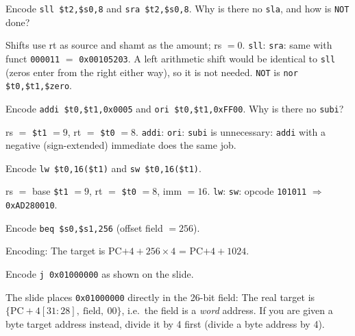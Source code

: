 \begin{exercise}[Shifts]
Encode \texttt{sll \$t2,\$s0,8} and \texttt{sra \$t2,\$s0,8}. Why is there no
\texttt{sla}, and how is \texttt{NOT} done?
\end{exercise}
\begin{solution}
Shifts use rt as source and shamt as the amount; rs $=0$.
\texttt{sll}: 
\texttt{sra}: same with funct \texttt{000011} $=$ \texttt{0x00105203}.
A left arithmetic shift would be identical to \texttt{sll} (zeros enter from
the right either way), so it is not needed. \texttt{NOT} is
\texttt{nor \$t0,\$t1,\$zero}.
\end{solution}

\begin{exercise}
Encode \texttt{addi \$t0,\$t1,0x0005} and
\texttt{ori \$t0,\$t1,0xFF00}. Why is there no \texttt{subi}?
\end{exercise}
\begin{solution}
rs $=$ \texttt{\$t1} $=9$, rt $=$ \texttt{\$t0} $=8$.
\texttt{addi}: 
\texttt{ori}: 
\texttt{subi} is unnecessary: \texttt{addi} with a negative (sign-extended)
immediate does the same job.
\end{solution}

\begin{exercise}
Encode \texttt{lw \$t0,16(\$t1)} and \texttt{sw \$t0,16(\$t1)}.
\end{exercise}
\begin{solution}
rs $=$ base \texttt{\$t1} $=9$, rt $=$ \texttt{\$t0} $=8$, imm $=16$.
\texttt{lw}: 
\texttt{sw}: opcode \texttt{101011} $\Rightarrow$ \texttt{0xAD280010}.
\end{solution}

\begin{exercise}[Branch]
Encode \texttt{beq \$s0,\$s1,256} (offset field $=256$).
\end{exercise}
\begin{solution}
Encoding:
The target is PC$+4+256\times4$ = PC$+4+1024$.
\end{solution}

\begin{exercise}[Jump]
Encode \texttt{j 0x01000000} as shown on the slide.
\end{exercise}
\begin{solution}
The slide places \texttt{0x01000000} directly in the 26-bit field:
The real target is $\{\text{PC}{+}4[31{:}28],\ \text{field},\ 00\}$, i.e.\
the field is a \emph{word} address. If you are given a byte target address
instead, divide it by 4 first (divide a byte address by 4).
\end{solution}

